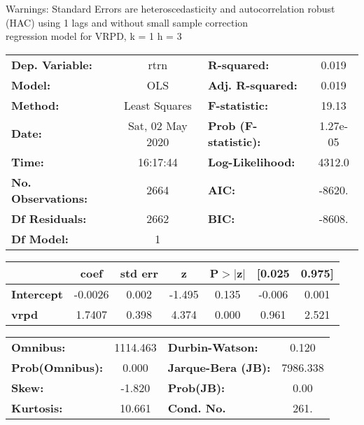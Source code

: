 Warnings: \newline
 [1] Standard Errors are heteroscedasticity and autocorrelation robust (HAC) using 1 lags and without small sample correction\\ 

regression model for VRPD, k = 1 h = 3\begin{center}
\begin{tabular}{lclc}
\toprule
\textbf{Dep. Variable:}    &       rtrn       & \textbf{  R-squared:         } &     0.019   \\
\textbf{Model:}            &       OLS        & \textbf{  Adj. R-squared:    } &     0.019   \\
\textbf{Method:}           &  Least Squares   & \textbf{  F-statistic:       } &     19.13   \\
\textbf{Date:}             & Sat, 02 May 2020 & \textbf{  Prob (F-statistic):} &  1.27e-05   \\
\textbf{Time:}             &     16:17:44     & \textbf{  Log-Likelihood:    } &    4312.0   \\
\textbf{No. Observations:} &        2664      & \textbf{  AIC:               } &    -8620.   \\
\textbf{Df Residuals:}     &        2662      & \textbf{  BIC:               } &    -8608.   \\
\textbf{Df Model:}         &           1      & \textbf{                     } &             \\
\bottomrule
\end{tabular}
\begin{tabular}{lcccccc}
                   & \textbf{coef} & \textbf{std err} & \textbf{z} & \textbf{P$> |$z$|$} & \textbf{[0.025} & \textbf{0.975]}  \\
\midrule
\textbf{Intercept} &      -0.0026  &        0.002     &    -1.495  &         0.135        &       -0.006    &        0.001     \\
\textbf{vrpd}      &       1.7407  &        0.398     &     4.374  &         0.000        &        0.961    &        2.521     \\
\bottomrule
\end{tabular}
\begin{tabular}{lclc}
\textbf{Omnibus:}       & 1114.463 & \textbf{  Durbin-Watson:     } &    0.120  \\
\textbf{Prob(Omnibus):} &   0.000  & \textbf{  Jarque-Bera (JB):  } & 7986.338  \\
\textbf{Skew:}          &  -1.820  & \textbf{  Prob(JB):          } &     0.00  \\
\textbf{Kurtosis:}      &  10.661  & \textbf{  Cond. No.          } &     261.  \\
\bottomrule
\end{tabular}
\end{center}

